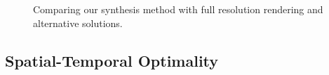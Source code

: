 \begin{figure}[htb]
\begin{minipage}{0.32\linewidth}
    \end{minipage}
    \begin{minipage}{0.32\linewidth} %
        
        
    \end{minipage}
    \begin{minipage}{0.32\linewidth} %
        
        
    \end{minipage}    
    
    \caption{Comparing our synthesis method with full resolution rendering and alternative solutions.}
    \label{fig:results:comparison}
\end{figure}

\subsection{Spatial-Temporal Optimality}
